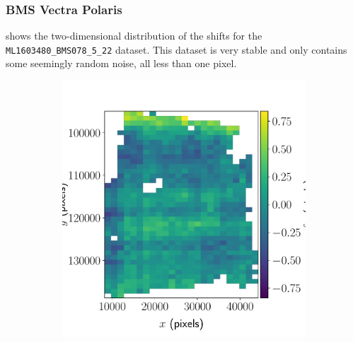 \documentclass{article}
\begin{document}
\subsubsection{BMS Vectra Polaris}
\label{sec:BMS2D}

 shows the two-dimensional distribution of the shifts for the \texttt{ML1603480\_BMS078\_5\_22} dataset.  This dataset is very stable and only contains some seemingly random noise, all less than one pixel.

\begin{figure}[ht]
	\centering
	\begin{subfigure}{0.49\linewidth}
		\includegraphics[width=\linewidth]{2D-shifts-BMS-x}
		\caption{}
		\label{fig:2DBMSx}
	\end{subfigure}
	\begin{subfigure}{0.49\linewidth}

\end{subfigure}
\end{figure}
\end{document}
